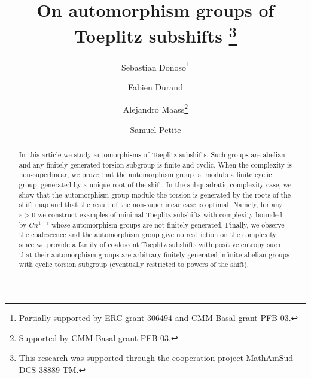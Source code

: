 \documentclass{daj}
\theoremstyle{plain}
\theoremstyle{definition}
\begin{document}
\begin{frontmatter}[classification=text]

\title{On automorphism groups of Toeplitz subshifts \thanks{This research was supported through the cooperation project MathAmSud DCS 38889 TM.}} %



\author[Sebastian]{Sebastian Donoso\thanks{ Partially supported by ERC grant 306494 and CMM-Basal grant PFB-03.}}
\author[Fabien]{Fabien Durand}%
\author[Alejandro]{Alejandro Maass\thanks{Supported by CMM-Basal grant PFB-03.}}
\author[Samuel]{Samuel Petite}%

\begin{abstract}
In this article we study automorphisms of Toeplitz subshifts. 
Such groups are abelian and any finitely generated torsion subgroup is finite and cyclic. 
When the complexity is non-superlinear, we prove that the automorphism group is, modulo a finite cyclic group,  generated by a unique root of the shift.
In the subquadratic complexity case, we show that the automorphism group modulo the torsion is generated by the roots of the shift map and that the result of the non-superlinear case is optimal. Namely,  for any $\varepsilon > 0$ we construct examples of minimal Toeplitz subshifts with complexity bounded by $C n^{1+\epsilon}$ whose automorphism groups are not finitely generated. Finally, we observe the coalescence and the automorphism group give no restriction on the complexity since we provide a family of coalescent Toeplitz subshifts with positive entropy such that their automorphism groups are arbitrary finitely generated infinite abelian groups with cyclic torsion subgroup (eventually restricted to powers of the shift). 		
\end{abstract}
\end{frontmatter}
\end{document}
